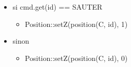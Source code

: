 \documentclass[11pt]{article}
\begin{document}
\begin{itemize}
\begin{itemize}
\begin{itemize}
\end{itemize} %

\item si cmd.get(id) == SAUTER\\
\label{sec-1.7.3.6.7}

\begin{itemize}

\item Position::setZ(position(C, id), 1)\\
\label{sec-1.7.3.6.7.1}


\end{itemize} %

\item sinon\\
\label{sec-1.7.3.6.8}

\begin{itemize}

\item Position::setZ(position(C, id), 0)\\
\label{sec-1.7.3.6.8.1}

\end{itemize} %
\end{itemize} %
\end{itemize} %
\end{document}
